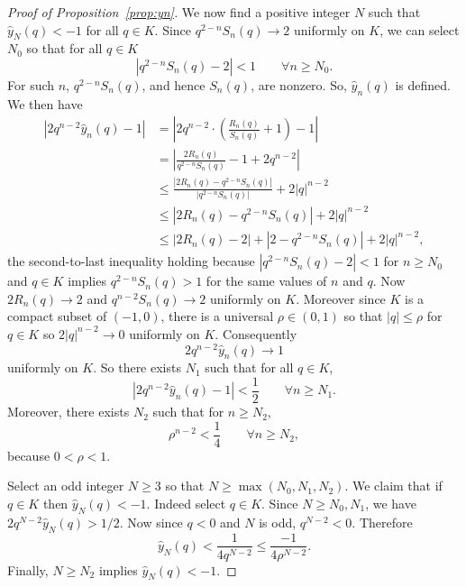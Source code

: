 \documentclass[10pt,a4paper]{amsart}
\begin{document}
\begin{proof}[Proof of Proposition~\ref{prop:yn}]
We now find a positive integer $N$ such that $\hat{y}_N(q)<-1$ for all $q \in K$. Since $q^{2-n}S_n(q) \to 2$ uniformly on $K$, we can select $N_0$ so that for all $q \in K$
\[
|q^{2-n}S_n(q)-2|<1 \qquad \forall n \geq N_0.
\]
For such $n$, $q^{2-n}S_n(q)$, and hence $S_n(q)$, are nonzero. So, $\hat{y}_n(q)$ is defined. We then have
\begin{align*}
|2q^{n-2}\hat{y}_n(q)-1| &=\left|2q^{n-2} \cdot \left(\frac{R_n(q)}{S_n(q)}+1\right)-1\right|\\
&= \left| \frac{2R_n(q)}{q^{2-n}S_n(q)} - 1 + 2q^{n-2} \right| \\
&\leq \frac{|2R_n(q)-q^{2-n}S_n(q)|}{|q^{2-n}S_n(q)|} + 2|q|^{n-2} \\
&\leq |2R_n(q)-q^{2-n}S_n(q)|+2|q|^{n-2} \\
&\leq |2R_n(q)-2|+|2-q^{2-n}S_n(q)|+2|q|^{n-2},
\end{align*}
the second-to-last inequality holding because $|q^{2-n}S_n(q)-2|<1$ for $n \geq N_0$ and $q \in K$ implies $q^{2-n}S_n(q)>1$ for the same values of $n$ and $q$. Now $2R_n(q) \to 2$ and $q^{n-2}S_n(q) \to 2$ uniformly on $K$. Moreover since $K$ is a compact subset of $(-1,0)$, there is a universal $\rho \in (0,1)$ so that $|q|\leq \rho$ for $q \in K$ so $2|q|^{n-2} \to 0$ uniformly on $K$. Consequently
\[
2q^{n-2}\hat{y}_n(q) \to 1
\]
uniformly on $K$. So there exists $N_1$ such that for all $q \in K$,
\[
|2q^{n-2}\hat{y}_n(q)-1|<\frac{1}{2} \qquad \forall n \geq N_1.
\]
Moreover, there exists $N_2$ such that for $n \geq N_2$, 
\[
\rho^{n-2}<\frac{1}{4} \qquad \forall n \geq N_2,
\]
because $0<\rho<1$. 

Select an odd integer $N \geq 3$ so that $N \geq \max(N_0,N_1,N_2)$. We claim that if $q \in K$ then $\hat{y}_N(q)<-1$. Indeed select $q \in K$. Since $N \geq N_0,N_1$, we have $2q^{N-2}\hat{y}_N(q)>1/2$. Now since $q<0$ and $N$ is odd, $q^{N-2}<0$. Therefore
\[
\hat{y}_N(q)<\frac{1}{4q^{N-2}} \leq \frac{-1}{4\rho^{N-2}}.
\]
Finally, $N \geq N_2$ implies $\hat{y}_N(q)<-1$. 
\end{proof}
\end{document}

